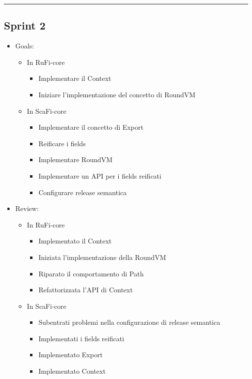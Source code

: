 \documentclass[12pt, a4paper]{article}
\begin{document}
\par\noindent\rule{\textwidth}{0.5pt}

\subsection*{Sprint 2}

\begin{itemize}
    \item Goals:
          \begin{itemize}
              \item In RuFi-core
                    \begin{itemize}
                        \item Implementare il Context
                        \item Iniziare l'implementazione del concetto di RoundVM
                    \end{itemize}
              \item In ScaFi-core
                    \begin{itemize}
                        \item Implementare il concetto di Export
                        \item Reificare i fields
                        \item Implementare RoundVM
                        \item Implementare un API per i fields reificati
                        \item Configurare release semantica
                    \end{itemize}
          \end{itemize}
    \item Review:
          \begin{itemize}
              \item In RuFi-core
                    \begin{itemize}
                        \item Implementato il Context
                        \item Iniziata l'implementazione della RoundVM
                        \item Riparato il comportamento di Path
                        \item Refattorizzata l'API di Context
                    \end{itemize}
              \item In ScaFi-core
                    \begin{itemize}
                        \item Subentrati problemi nella configurazione di release semantica
                        \item Implementati i fields reificati
                        \item Implementato Export
                        \item Implementato Context
                    \end{itemize}
          \end{itemize}
\end{itemize}
\end{document}
